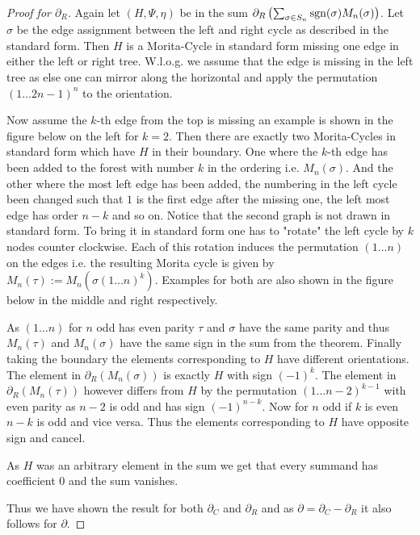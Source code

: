 \begin{proof}[Proof for $\partial_{R}$]
	Again let $(H,\Psi,\eta)$ be in the sum $\partial_{R}\left(\sum_{\sigma \in S_{n}} \operatorname{sgn}(\sigma) M_{n}(\sigma)\right)$.
	Let $\sigma$ be the edge assignment between the left and right cycle as described in the standard form.
	Then $H$ is a Morita-Cycle in standard form missing one edge in either the left or right tree.
	W.l.o.g. we assume that the edge is missing in the left tree as else one can mirror along the horizontal
	and apply the permutation $(1 \ldots 2n-1)^{n}$ to the orientation.

	Now assume the $k$-th edge from the top is missing an example is shown in the figure below on the left for $k = 2$.
	Then there are exactly two Morita-Cycles in standard form which have $H$ in their boundary.
	One where the $k$-th edge has been added to the forest with number $k$ in the ordering i.e. $M_{n}(\sigma)$.
	And the other where the most left edge has been added, the numbering in the left cycle been changed such that $1$ is the first edge 
	after the missing one, the left most edge has order $n-k$ and so on.
	Notice that the second graph is not drawn in standard form. To bring it in standard form one has to "rotate" the left cycle
	by $k$ nodes counter clockwise. Each of this rotation induces the permutation $(1 \ldots n)$ on the edges i.e.
	the resulting Morita cycle is given by $M_{n}(\tau) := M_{n}(\sigma (1 \ldots n)^{k})$.
	Examples for both are also shown in the figure below in the middle and right respectively.
	
	As $(1 \ldots n)$ for $n$ odd has even parity $\tau$ and $\sigma$ have the same parity and thus $M_{n}(\tau)$ and $M_{n}(\sigma)$ have the same sign
	in the sum from the theorem. 
	Finally taking the boundary the elements corresponding to $H$ have different orientations.
	The element in $\partial_{R}(M_{n}(\sigma))$ is exactly $H$ with sign $(-1)^{k}$. The element in $\partial_{R}(M_{n}(\tau))$ however 
	differs from $H$ by the permutation $(1 \ldots n-2)^{k - 1}$ with even parity as $n-2$ is odd and has sign $(-1)^{n-k}$.
	Now for $n$ odd if $k$ is even $n-k$ is odd and vice versa. Thus the elements corresponding to $H$ have opposite sign and cancel.

	As $H$ was an arbitrary element in the sum we get that every summand has coefficient $0$ and the sum vanishes.


	Thus we have shown the result for both $\partial_{C}$ and $\partial_{R}$ and as $\partial = \partial_{C} - \partial_{R}$ it also follows for $\partial$.
\end{proof}

\newpage
\printbibliography




